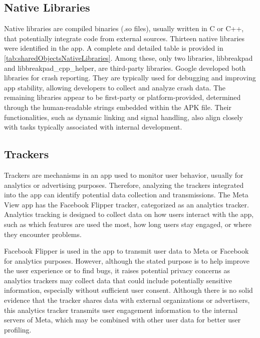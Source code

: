 \subsection*{Native Libraries}
Native libraries are compiled binaries (.so files), usually written in C or C++, that potentially integrate code from external sources. Thirteen native libraries were identified in the app. A complete and detailed table is provided in \ref{tab:sharedObjectsNativeLibraries}. Among these, only two libraries, libbreakpad and libbreakpad\_cpp\_helper, are third-party libraries. Google developed both libraries for crash reporting. They are typically used for debugging and improving app stability, allowing developers to collect and analyze crash data. The remaining libraries appear to be first-party or platform-provided, determined through the human-readable strings embedded within the APK file. Their functionalities, such as dynamic linking and signal handling, also align closely with tasks typically associated with internal development.

\subsection*{Trackers}
Trackers are mechanisms in an app used to monitor user behavior, usually for analytics or advertising purposes. Therefore, analyzing the trackers integrated into the app can identify potential data collection and transmissions. The Meta View app has the Facebook Flipper tracker, categorized as an analytics tracker. Analytics tracking is designed to collect data on how users interact with the app, such as which features are used the most, how long users stay engaged, or where they encounter problems.

Facebook Flipper is used in the app to transmit user data to Meta or Facebook for analytics purposes. However, although the stated purpose is to help improve the user experience or to find bugs, it raises potential privacy concerns as analytics trackers may collect data that could include potentially sensitive information, especially without sufficient user consent. Although there is no solid evidence that the tracker shares data with external organizations or advertisers, this analytics tracker transmits user engagement information to the internal servers of Meta, which may be combined with other user data for better user profiling.

